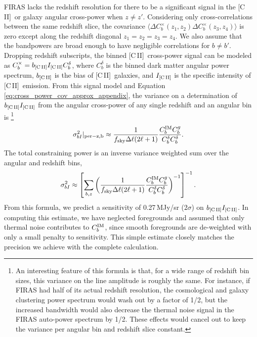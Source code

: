 \documentclass[fleqn,usenatbib]{mnras}
\newcommand{\cii}{[C{\sc\,II}]}
\begin{document}
FIRAS lacks the redshift resolution for there to be a significant signal in the \cii\, or galaxy angular cross-power when $z \neq z'$. Considering only cross-correlations between the same redshift slice, the covariance $\langle \Delta C_b^{\times}(z_1,z_2) \Delta C_b^{\times}(z_3,z_4) \rangle$ is zero except along the redshift diagonal $z_1 {=} z_2 {=} z_3 {=} z_4$. We also assume that the bandpowers are broad enough to have negligible correlations for $b \neq b'$. 
Dropping redshift subscripts, the binned \cii\ cross-power signal can be modeled as $C^{\times}_b = b_{\rm \cii}I_{\rm \cii}C^{\delta}_b$, where $C^{\delta}_b$ is the binned dark matter angular power spectrum, $b_{\rm \cii}$ is the bias of \cii\ galaxies, and $I_{\rm \cii}$ is the specific intensity of \cii\ emission. From this signal model and Equation\,\ref{eq:cross_power_cov_approx_appendix}, the variance on a determination of $b_{\rm \cii}I_{\rm \cii}$ from the angular cross-power of any single redshift and an angular bin is \footnote{An interesting feature of this formula is that, for a wide range of redshift bin sizes, this variance on the line amplitude is roughly the same. For instance, if FIRAS had half of its actual redshift resolution, the cosmological and galaxy clustering power spectrum would wash out by a factor of 1/2, but the increased bandwidth would also decrease the thermal noise signal in the FIRAS auto-power spectrum by 1/2. These effects would cancel out to keep the variance per angular bin and redshift slice constant.}
\begin{equation}\label{eq: bI_var_per_z_bin}
\sigma^2_{bI} |_{\rm per-z,b} \approx \frac{1}{f_{\rm sky} \Delta \ell (2\ell + 1)} \frac{C_b^{\rm IM} C_b^{g}}{C^{\delta}_b C^{\delta}_b}. 
\end{equation}
The total constraining power is an inverse variance weighted sum over the angular and redshift bins,
\begin{equation}\label{eq:bI_var}
\sigma^2_{bI} \approx \left[ \sum_{b,z} \left( \frac{1}{f_{\rm sky} \Delta \ell (2\ell + 1)} \frac{ C_b^{\rm IM} C_b^{g}}{C^{\delta}_bC^{\delta}_b} \right)^{-1} \right]^{-1}. 
\end{equation}
From this formula, we predict a sensitivity of 0.27\,MJy/sr ($2\sigma$) on $b_{\rm \cii}I_{\rm \cii}$. In computing this estimate, we have neglected foregrounds and assumed that only thermal noise contributes to $C_b^{\rm IM}$, since smooth foregrounds are de-weighted with only a small penalty to sensitivity. This simple estimate closely matches the precision we achieve with the complete calculation. 
\end{document}

